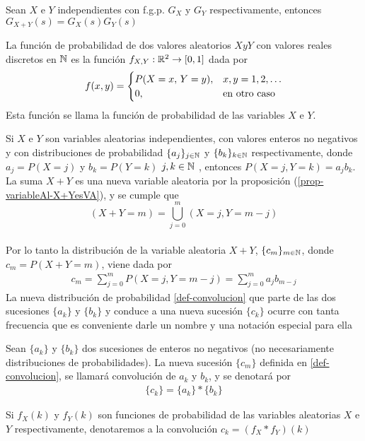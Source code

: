 \begin{Prop}
    Sean $X$ e $Y$ independientes con f.g.p. $G_X$ y $G_Y$ respectivamente, entonces $G_{X+Y}(s)=G_X(s)G_Y(s)$
    \label{prop-funcionGenSuma-productoFuncionGen}
\end{Prop}
\begin{Def} 
    La función de probabilidad de dos valores aleatorios $X y Y$ con valores reales discretos en ${\mathbb{N}}$ es la función $f_{X,Y} :{\mathbb{R}}^2 \rightarrow [0, 1]$ dada por
    $$f(x,y)=
    \begin{cases}
        P(X=x,\thinspace Y=y), & \mbox{$x,y=1,2,\ldots$}\\
        0,& \mbox{en otro caso}
    \end{cases}$$
    Esta función se llama la función de probabilidad de las variables $X$ e $Y$.
\end{Def}
Si $X$ e $Y$ son variables aleatorias independientes, con valores enteros no negativos y con distribuciones de probabilidad $\{a_j\}_{j\in{\mathbb{N}}}$ y $\{b_k\}_{k\in{\mathbb{N}}}$ respectivamente, donde $a_j=P(X=j)$ y  $b_k=P(Y=k)$ $j,k\in{\mathbb{N}}$ , entonces $P(X=j,Y=k)=a_j b_k$.\\ La suma $X+Y$ es una nueva variable aleatoria por la proposición (\ref{prop-variableAl-X+YesVA}), y se cumple que $$(X+Y=m)=\bigcup_{j=0}^{m}(X=j,Y=m-j)$$ \\ Por lo tanto la distribución de la variable aleatoria $X+Y$, $\{c_m\}_{m\in{\mathbb{N}}}$, donde $c_m=P(X+Y=m)$, viene dada por
\begin{eqnarray}
    c_m=\sum_{j=0}^m P(X=j,Y=m-j)=\sum_{j=0}^m a_j b_{m-j}\label{def-convolucion}
\end{eqnarray}
La nueva distribución de probabilidad \ref{def-convolucion} que parte de las dos sucesiones $\{a_k\}$ y $\{b_k\}$ y conduce a una nueva sucesión $\{c_k\}$ ocurre con tanta frecuencia que es conveniente darle un nombre y una notación especial para ella
\begin{Def}
    Sean $\{a_k\}$ y $\{b_k\}$ dos sucesiones de enteros no negativos (no necesariamente distribuciones de probabilidades). La nueva sucesión $\{c_m\}$ definida en \ref{def-convolucion}, se llamará convolución de $a_k$ y $b_k$, y se denotará por
    \begin{eqnarray}
        \{c_k\}=\{a_k\}*\{b_k\}
        \label{def-notaciónConvolucion}
    \end{eqnarray}
\end{Def}
\begin{Obs}
    Si $f_X(k)$ y $f_Y(k)$ son funciones de probabilidad de las variables aleatorias $X$ e $Y$ respectivamente, denotaremos a la convolución $c_k=(f_X*f_Y)(k)$
\end{Obs}
